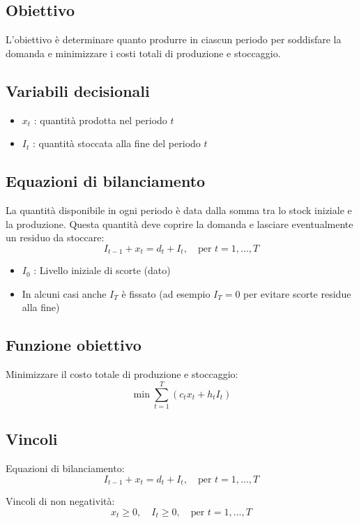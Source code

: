 \subsection{Obiettivo}
L'obiettivo è determinare quanto produrre in ciascun periodo per soddisfare la domanda e minimizzare i costi totali di produzione e stoccaggio.

\subsection{Variabili decisionali}
\begin{itemize}
    \item $x_t$ : quantità prodotta nel periodo $t$
    \item $I_t$ : quantità stoccata alla fine del periodo $t$
\end{itemize}

\subsection{Equazioni di bilanciamento}
La quantità disponibile in ogni periodo è data dalla somma tra lo stock iniziale e la produzione. 
Questa quantità deve coprire la domanda e lasciare eventualmente un residuo da stoccare:
\[
I_{t-1} + x_t = d_t + I_t, \quad \text{per } t = 1, \dots, T
\]

\begin{itemize}
    \item $I_0$ : Livello iniziale di scorte (dato)
    \item In alcuni casi anche $I_T$ è fissato (ad esempio $I_T=0$ per evitare scorte residue alla fine)
\end{itemize}

\subsection{Funzione obiettivo}
Minimizzare il costo totale di produzione e stoccaggio:
\[
\min \sum_{t=1}^{T} \left( c_t x_t + h_t I_t \right)
\]

\subsection{Vincoli}

Equazioni di bilanciamento:
\[
I_{t-1} + x_t = d_t + I_t, \quad \text{per } t = 1, \dots, T
\]

Vincoli di non negatività:
\[
x_t \geq 0, \quad I_t \geq 0, \quad \text{per } t = 1, \dots, T
\]

